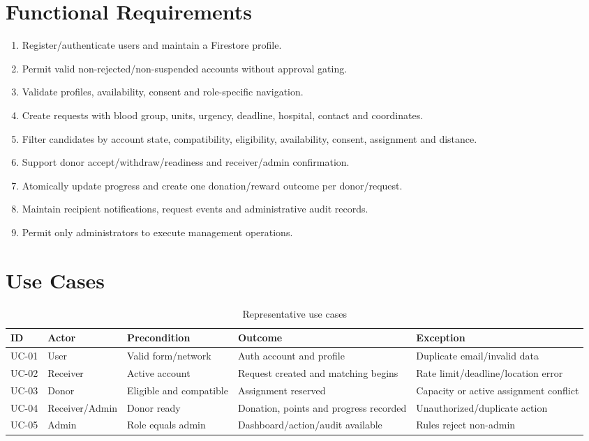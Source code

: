 \section{Functional Requirements}
\begin{enumerate}[label=FR\arabic*.]
\item Register/authenticate users and maintain a Firestore profile.
\item Permit valid non-rejected/non-suspended accounts without approval gating.
\item Validate profiles, availability, consent and role-specific navigation.
\item Create requests with blood group, units, urgency, deadline, hospital, contact and coordinates.
\item Filter candidates by account state, compatibility, eligibility, availability, consent, assignment and distance.
\item Support donor accept/withdraw/readiness and receiver/admin confirmation.
\item Atomically update progress and create one donation/reward outcome per donor/request.
\item Maintain recipient notifications, request events and administrative audit records.
\item Permit only administrators to execute management operations.
\end{enumerate}
\section{Use Cases}
\begin{table}[H]\small\centering\caption{Representative use cases}\begin{tabularx}{\textwidth}{p{1.5cm}p{2cm}XXX}\toprule ID&Actor&Precondition&Outcome&Exception\\\midrule
UC-01&User&Valid form/network&Auth account and profile&Duplicate email/invalid data\\
UC-02&Receiver&Active account&Request created and matching begins&Rate limit/deadline/location error\\
UC-03&Donor&Eligible and compatible&Assignment reserved&Capacity or active assignment conflict\\
UC-04&Receiver/Admin&Donor ready&Donation, points and progress recorded&Unauthorized/duplicate action\\
UC-05&Admin&Role equals admin&Dashboard/action/audit available&Rules reject non-admin\\\bottomrule\end{tabularx}\end{table}
